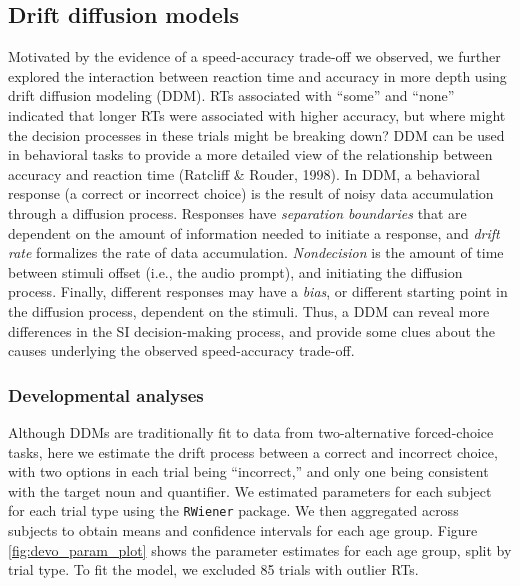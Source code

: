 \documentclass[10pt, letterpaper]{article}
\begin{document}
\subsection{Drift diffusion models}\label{drift-diffusion-models}

Motivated by the evidence of a speed-accuracy trade-off we observed, we
further explored the interaction between reaction time and accuracy in
more depth using drift diffusion modeling (DDM). RTs associated with
``some'' and ``none'' indicated that longer RTs were associated with
higher accuracy, but where might the decision processes in these trials
might be breaking down? DDM can be used in behavioral tasks to provide a
more detailed view of the relationship between accuracy and reaction
time (Ratcliff \& Rouder, 1998). In DDM, a behavioral response (a
correct or incorrect choice) is the result of noisy data accumulation
through a diffusion process. Responses have \emph{separation boundaries}
that are dependent on the amount of information needed to initiate a
response, and \emph{drift rate} formalizes the rate of data
accumulation. \emph{Nondecision} is the amount of time between stimuli
offset (i.e., the audio prompt), and initiating the diffusion process.
Finally, different responses may have a \emph{bias}, or different
starting point in the diffusion process, dependent on the stimuli. Thus,
a DDM can reveal more differences in the SI decision-making process, and
provide some clues about the causes underlying the observed
speed-accuracy trade-off.

\subsubsection{Developmental analyses}\label{developmental-analyses}

Although DDMs are traditionally fit to data from two-alternative
forced-choice tasks, here we estimate the drift process between a
correct and incorrect choice, with two options in each trial being
``incorrect,'' and only one being consistent with the target noun and
quantifier. We estimated parameters for each subject for each trial type
using the \texttt{RWiener} package. We then aggregated across subjects
to obtain means and confidence intervals for each age group. Figure
\ref{fig:devo_param_plot} shows the parameter estimates for each age
group, split by trial type. To fit the model, we excluded 85 trials with
outlier RTs.
\end{document}
